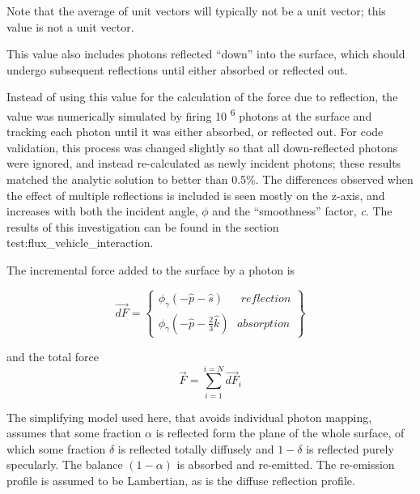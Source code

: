          Note that the average of unit vectors will typically not be a unit
         vector; this value is not a unit vector.

         This value also includes photons reflected ``down'' into the
         surface, which should undergo subsequent reflections until either
         absorbed or reflected out.

         Instead of using this value for the calculation of the force due to
         reflection, the value was numerically simulated by firing 10
         \textsuperscript{6} photons at the surface and tracking each photon
         until it was either absorbed, or reflected out.
         For code validation, this process was changed slightly so that all
         down{}-reflected photons were ignored, and instead re-calculated as
         newly incident photons; these results matched the analytic
         solution to better than 0.5\%.
         The differences observed when the effect of multiple
         reflections is included is seen mostly on the z{}-axis, and
         increases with both the incident angle, $\phi $  and the
         ``smoothness'' factor, \textit{c}.  The results of this
         investigation can be found in the section 
         {test:flux_vehicle_interaction}.


         The incremental force added to the surface by a photon is

         \begin{equation*}
         \vec{\mathit{dF}}=\left\{\begin{matrix}\phi _{\gamma
         }\left(-\hat{p}-\hat{s}\right)\ \ \ \ \ \ \ \mathit{reflection}\\\phi
         _{\gamma
         }\left(-\hat{p}-\frac{2}{3}\hat{k}\right)\ \ \
         \mathit{absorption}\end{matrix}\right\}
         \end{equation*}


         and the total force
         \begin{equation}
           \vec{F}=\sum _{i=1}^{i=N}\vec{\mathit{dF}}_{i}
           \label{eqn:force_plate}
         \end{equation}


         The simplifying model used here, that avoids individual photon
         mapping, assumes that some fraction  $\alpha $ is
         reflected form the plane of the whole surface, of which some fraction
         $\delta $ is reflected totally diffusely and
         $1-\delta $ is reflected purely specularly. The
         balance $(1-\alpha )$ is absorbed and re{}-emitted.
         The re{}-emission profile is assumed to be Lambertian, as is the
         diffuse reflection profile. \

